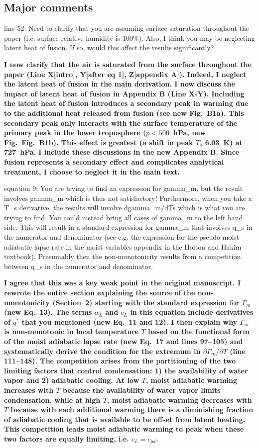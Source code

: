 \documentclass{article}
\begin{document}
\subsection{Major comments}
line 52: Need to clarify that you are assuming surface saturation throughout the paper (i.e. surface relative humidity is 100\%). Also, I think you may be neglecting latent heat of fusion. If so, would this affect the results significantly?
\par
\textbf{I now clarify that the air is saturated from the surface throughout the paper (Line X[intro], Y[after eq 1], Z[appendix A]). Indeed, I neglect the latent heat of fusion in the main derivation. I now discuss the impact of latent heat of fusion in Appendix B (Line X-Y). Including the latent heat of fusion introduces a secondary peak in warming due to the additional heat released from fusion (see new Fig.~B1a). This secondary peak only interacts with the surface temperature of the primary peak in the lower troposphere ($p<500$~hPa, new Fig.~Fig.~B1b). This effect is greatest (a shift in peak $T_s$ 6.03~K) at 727~hPa. I include these discussions in the new Appendix B. Since fusion represents a secondary effect and complicates analytical treatment, I choose to neglect it in the main text.}
\par
equation 9: You are trying to find an expression for gamma\_m, but the result involves gamma\_m which is thus not satisfactory! Furthermore, when you take a T\_s derivative, the results will involve dgamma\_m/dTs which is what you are trying to find. You could instead bring all cases of gamma\_m to the left hand side. This will result in a standard expression for gamma\_m that involves q\_s in the numerator and denominator (see e.g. the expression for the pseudo moist adiabatic lapse rate in the moist variables appendix in the Holton and Hakim textbook). Presumably then the non-monotonicity results from a competition between q\_s in the numerator and denominator.
\par
\textbf{I agree that this was a key weak point in the original manuscript. I rewrote the entire section explaining the source of the non-monotonicity (Section~2) starting with the standard expression for $\Gamma_m$ (new Eq.~13). The terms $\alpha_L$ and $c_L$ in this equation include derivatives of $q^*$ that you mentioned (new Eq.~11 and 12). I then explain why $\Gamma_m$ is non-monotonic in local temperature $T$ based on the functional form of the moist adiabatic lapse rate (new Eq.~17 and lines 97--105) and systematically derive the condition for the extremum in $\partial\Gamma_m/\partial T$ (line 111--148). The competition arises from the partitioning of the two limiting factors that control condensation: 1) the availability of water vapor and 2) adiabatic cooling. At low $T$, moist adiabatic warming increases with $T$ because the availability of water vapor limits condensation, while at high $T$, moist adiabatic warming decreases with $T$ because with each additional warming there is a diminishing fraction of adiabatic cooling that is available to be offset from latent heating. This competition leads moist adiabatic warming to peak when these two factors are equally limiting, i.e. $c_L = c_{pd}$.}
\end{document}
